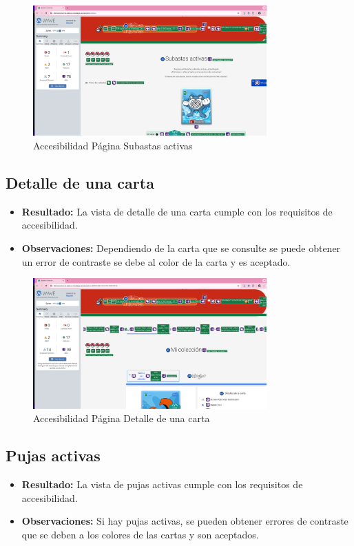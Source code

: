 \begin{figure}[H]
    \centering
    \includegraphics[width=0.8\textwidth]{figures/accesibilidad/A-acc-subastas.png}
    \caption{Accesibilidad Página Subastas activas}
    \label{fig:Acc-Subastas}
\end{figure}

\subsection*{Detalle de una carta}
\begin{itemize}
    \item \textbf{Resultado:} La vista de detalle de una carta cumple con los requisitos de accesibilidad.
    \item \textbf{Observaciones:} Dependiendo de la carta que se consulte se puede obtener un error de contraste se debe al color de la carta y es aceptado.
\end{itemize}

\begin{figure}[H]
    \centering
    \includegraphics[width=0.8\textwidth]{figures/accesibilidad/A-acc-detalle-carta.png}
    \caption{Accesibilidad Página Detalle de una carta}
    \label{fig:Acc-Detalle-Carta}
\end{figure}


\subsection*{Pujas activas}
\begin{itemize}
    \item \textbf{Resultado:} La vista de pujas activas cumple con los requisitos de accesibilidad.
    \item \textbf{Observaciones:} Si hay pujas activas, se pueden obtener errores de contraste que se deben a los colores de las cartas y son aceptados.
\end{itemize}



